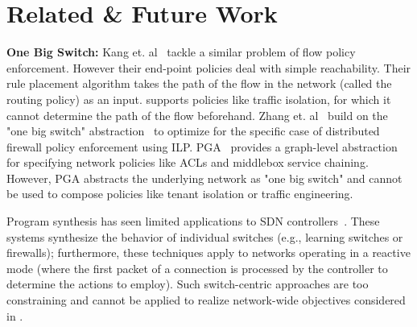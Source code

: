 \section{Related \& Future Work} \label{sec:relatedwork}
\textbf{One Big Switch:} Kang et. al~\cite{oneswitch} tackle a 
similar problem of flow policy
enforcement. However their end-point policies deal with simple
reachability. Their rule placement algorithm takes the path of the
flow in the network  (called the routing policy) as an input. %
\Name supports policies like traffic isolation, 
for which it cannot determine the path of the flow
beforehand. %
Zhang et. al~\cite{distfirewall} build on the "one big switch"  
abstraction~\cite{oneswitch} to optimize for the specific case of
distributed firewall policy enforcement using ILP.  PGA~\cite{pga} provides
a graph-level abstraction for specifying network policies like ACLs and
middlebox service chaining. However, PGA abstracts the underlying
network as "one big switch" and cannot be used to compose policies like
tenant isolation or traffic engineering.

 Program synthesis has
 seen limited applications to SDN controllers~\cite{netegg,decentralize}.
These systems synthesize the
 behavior of individual switches (e.g., learning switches or
 firewalls); furthermore, these techniques apply to networks
 operating in a reactive mode (where the first packet of a connection
 is processed by the controller to determine the actions to
 employ). Such switch-centric approaches are too constraining and
 cannot be applied to realize network-wide objectives considered 
 in \name.
 
